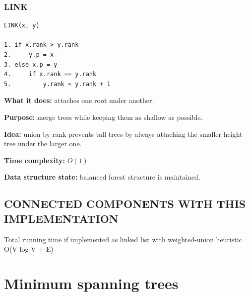 \documentclass[11pt,a4paper,openany]{book}
\begin{document}
\subsection{LINK}



\begin{lstlisting}
LINK(x, y)

1. if x.rank > y.rank
2.     y.p = x
3. else x.p = y
4.     if x.rank == y.rank
5.         y.rank = y.rank + 1
\end{lstlisting}

\textbf{What it does:} attaches one root under another.

\textbf{Purpose:} merge trees while keeping them as shallow as possible.

\textbf{Idea:} union by rank prevents tall trees by always attaching the smaller height tree under the larger one.

\textbf{Time complexity:} $O(1)$

\textbf{Data structure state:} balanced forest structure is maintained.














\vspace{2cm}





\section{CONNECTED COMPONENTS WITH THIS IMPLEMENTATION}


\begin{defnbox}[title=NEW TIME COMPLEXITY]
Total running time if implemented as linked list with
weighted-union heuristic
O(V log V + E)
\end{defnbox}








\vspace{2cm}





\chapter{Minimum spanning trees}
\end{document}
